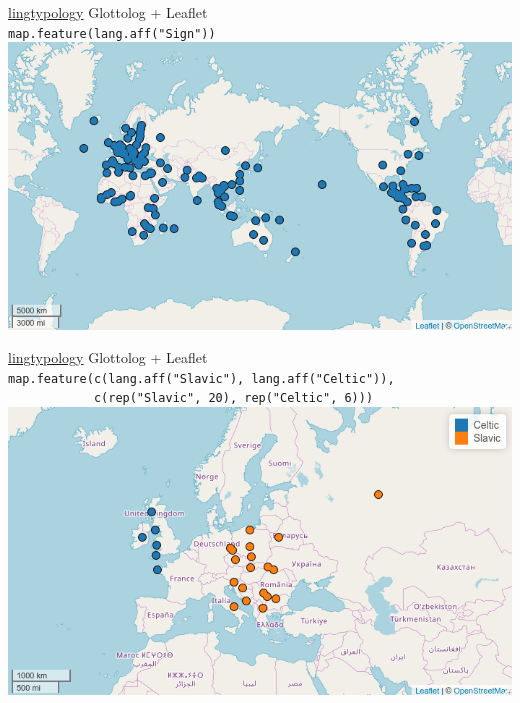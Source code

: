 \documentclass[13pt, t]{beamer}
\begin{document}
\begin{frame}{\href{https://ropensci.github.io/lingtypology/}{lingtypology}}
\alert{\large Glottolog + Leaflet}\\
\vfill
\texttt{\small map.feature(lang.aff("Sign"))}\\
\includegraphics[width=\linewidth]{images/02-sign}
\end{frame}

\begin{frame}{\href{https://ropensci.github.io/lingtypology/}{lingtypology}}
\alert{\large Glottolog + Leaflet}\\
\vfill
\texttt{\small  map.feature(c(lang.aff("Slavic"), lang.aff("Celtic")),}\\
\texttt{\small \ \ \ \ \ \ \ \ \ \ \ \ c(rep("Slavic"{}, 20), rep("Celtic"{}, 6)))}\\
\includegraphics[width=\linewidth]{images/03-colored}
\end{frame}
\end{document}
